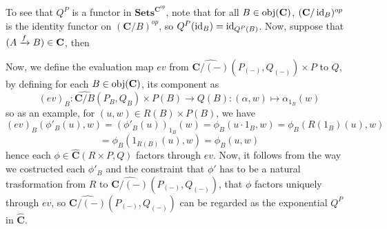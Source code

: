 To see that $Q^P$ is a functor in $\mathbf{Sets}^{\mathbf{C}^{op}}$, note that for all $B\in\operatorname{\operatorname{obj}}(\mathbf{C})$, $(\mathbf{C}/\operatorname{\operatorname{id}}_B)^{op}$ is the identity functor on $(\mathbf{C}/B)^{op}$, so $Q^P(\operatorname{\operatorname{id}}_B)=\operatorname{\operatorname{id}}_{Q^P(B)}$. Now, suppose that $(A\xrightarrow{f}B)\in\mathbf{C}$, then

Now, we define the evaluation map $ev$ from $\widehat{\mathbf{C}/(-)}(P_{(-)},Q_{(-)})\times P$ to $Q$, by defining for each $B\in\operatorname{\operatorname{obj}}(\mathbf{C})$, its component as
\[(ev)_B:\widehat{\mathbf{C}/B}(P_B,Q_B)\times P(B)\to Q(B):(\alpha,w)\mapsto\alpha_{1_B}(w)\]
so as an example, for $(u,w)\in R(B)\times P(B)$, we have
\[(ev)_B(\phi'_B(u),w)=(\phi'_B(u))_{1_B}(w)=\phi_B(u\cdot1_B,w)=\phi_B(R(1_B)(u),w)\]
\[=\phi_B(1_{R(B)}(u),w)=\phi_B(u,w)\]
hence each $\phi\in\widehat{\mathbf{C}}(R\times P,Q)$ factors through $ev$. Now, it follows from the way we costructed each $\phi'_B$ and the constraint that $\phi'$ has to be a natural trasformation from $R$ to $\widehat{\mathbf{C}/(-)}(P_{(-)},Q_{(-)})$, that $\phi$ factors uniquely through $ev$, so $\widehat{\mathbf{C}/(-)}(P_{(-)},Q_{(-)})$ can be regarded as the exponential $Q^P$ in $\widehat{\mathbf{C}}$.